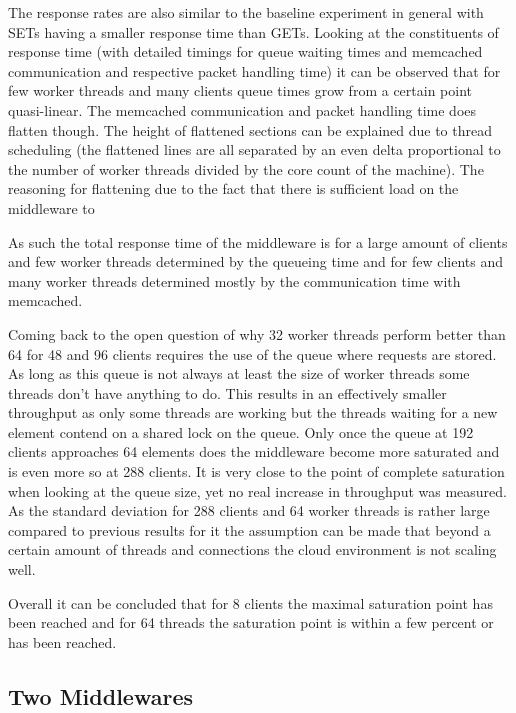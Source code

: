             The response rates are also similar to the baseline experiment in general with SETs having a smaller
            response time than GETs. Looking at the constituents of response time (with detailed timings for queue
            waiting times and memcached communication and respective packet handling time) it can be observed that for
            few worker threads and many clients queue times grow from a certain point quasi-linear. The memcached
            communication and packet handling time does flatten though. The height of flattened sections can be
            explained due to thread scheduling (the flattened lines are all separated by an even delta proportional to
            the number of worker threads divided by the core count of the machine). The reasoning for flattening due to
            the fact that there is sufficient load on the middleware to 

            As such the total response time of the middleware is for a large amount of clients and few worker threads
            determined by the queueing time and for few clients and many worker threads determined mostly by the
            communication time with memcached.

            Coming back to the open question of why 32 worker threads perform better than 64 for 48 and 96 clients
            requires the use of the queue where requests are stored. As long as this queue is not always at least the
            size of worker threads some threads don't have anything to do. This results in an effectively smaller
            throughput as only some threads are working but the threads waiting for a new element contend on a shared
            lock on the queue. Only once the queue at 192 clients approaches 64 elements does the middleware become more
            saturated and is even more so at 288 clients. It is very close to the point of complete saturation when
            looking at the queue size, yet no real increase in throughput was measured. As the standard deviation for
            288 clients and 64 worker threads is rather large compared to previous results for it the assumption can be
            made that beyond a certain amount of threads and connections the cloud environment is not scaling well.

            Overall it can be concluded that for 8 clients the maximal saturation point has been reached
            and for 64 threads the saturation point is within a few percent or has been reached.

    \subsection{Two Middlewares\label{subsec:3_two-middlewares}}

